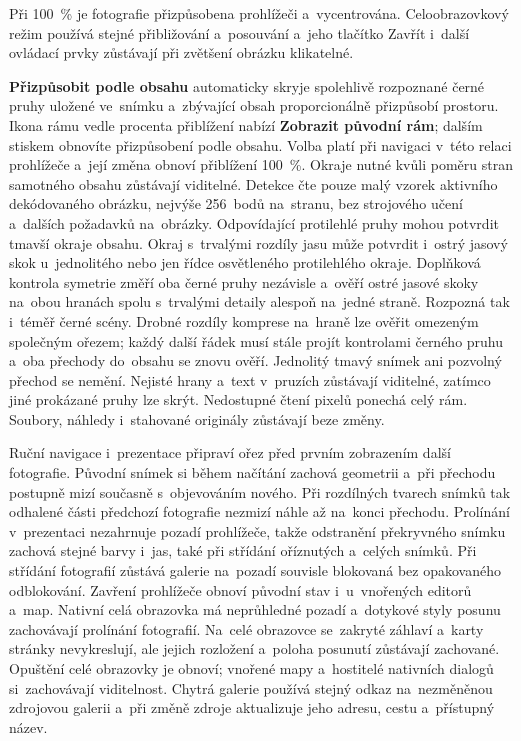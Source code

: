 \documentclass[11pt,a4paper]{article}
\newcommand{\ui}[1]{\textbf{#1}}
\begin{document}
Při 100~\% je fotografie přizpůsobena prohlížeči a~vycentrována. Celoobrazovkový
režim používá stejné přibližování a~posouvání a~jeho tlačítko Zavřít i~další
ovládací prvky zůstávají při zvětšení obrázku klikatelné.

\ui{Přizpůsobit podle obsahu} automaticky skryje spolehlivě rozpoznané černé
pruhy uložené ve~snímku a~zbývající obsah proporcionálně přizpůsobí prostoru.
Ikona rámu vedle procenta přiblížení nabízí \ui{Zobrazit původní rám}; dalším
stiskem obnovíte přizpůsobení podle obsahu. Volba platí při navigaci v~této
relaci prohlížeče a~její změna obnoví přiblížení 100~\%. Okraje nutné kvůli
poměru stran samotného obsahu zůstávají viditelné.
Detekce čte pouze malý vzorek aktivního dekódovaného obrázku, nejvýše
256~bodů na~stranu, bez strojového učení a~dalších požadavků na~obrázky.
Odpovídající protilehlé pruhy mohou potvrdit tmavší okraje obsahu. Okraj
s~trvalými rozdíly jasu může potvrdit i~ostrý jasový skok u~jednolitého nebo
jen řídce osvětleného protilehlého okraje. Doplňková kontrola symetrie změří
oba černé pruhy nezávisle a~ověří ostré jasové skoky na~obou hranách spolu
s~trvalými detaily alespoň na~jedné straně. Rozpozná tak i~téměř černé scény.
Drobné rozdíly komprese na~hraně lze ověřit omezeným společným ořezem;
každý další řádek musí stále projít kontrolami černého pruhu a~oba přechody
do~obsahu se znovu ověří.
Jednolitý tmavý snímek ani
pozvolný přechod se nemění. Nejisté
hrany a~text v~pruzích zůstávají viditelné, zatímco jiné prokázané pruhy lze
skrýt. Nedostupné čtení pixelů ponechá celý rám. Soubory, náhledy i~stahované
originály zůstávají beze změny.

Ruční navigace i~prezentace připraví ořez před prvním zobrazením další
fotografie. Původní snímek si během načítání zachová geometrii a~při přechodu
postupně mizí současně s~objevováním nového. Při rozdílných tvarech snímků
tak odhalené části předchozí fotografie nezmizí náhle až na~konci přechodu.
Prolínání v~prezentaci nezahrnuje pozadí prohlížeče, takže odstranění
překryvného snímku
zachová stejné barvy i~jas, také při střídání oříznutých a~celých snímků.
Při střídání fotografií zůstává galerie na~pozadí souvisle blokovaná bez
opakovaného odblokování. Zavření prohlížeče obnoví původní stav i~u~vnořených
editorů a~map. Nativní celá obrazovka má neprůhledné pozadí a~dotykové styly
posunu zachovávají prolínání fotografií.
Na~celé obrazovce se~zakryté záhlaví a~karty stránky nevykreslují, ale jejich
rozložení a~poloha posunutí zůstávají zachované. Opuštění celé obrazovky je
obnoví; vnořené mapy a~hostitelé nativních dialogů si~zachovávají viditelnost.
Chytrá galerie používá stejný odkaz na~nezměněnou zdrojovou galerii a~při
změně zdroje aktualizuje jeho adresu, cestu a~přístupný název.
\end{document}
